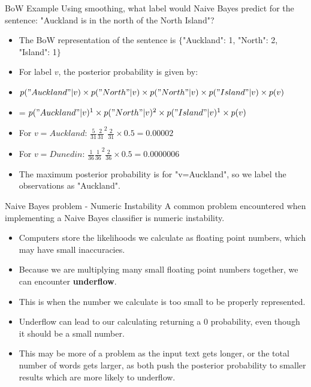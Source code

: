 \documentclass[aspectratio=169, 10pt]{beamer}
\begin{document}
\begin{frame}{BoW Example}
    Using smoothing, what label would Naive Bayes predict for the sentence: "Auckland is in the north of the North Island"?
    \pause
    \begin{itemize}
        \item The BoW representation of the sentence is $\{$"Auckland": 1, "North": 2, "Island": 1$\}$
        \item For label $v$, the posterior probability is given by:
        \item $p("Auckland"|v)\times p("North"|v) \times p("North"|v) \times p("Island"|v) \times p(v)$
        \item = $p("Auckland"|v)^1\times p("North"|v)^2 \times p("Island"|v)^1 \times p(v)$
        \pause
        \item For $v=Auckland$: $\frac{5}{31}\frac{2}{31}^2\frac{2}{31}\times 0.5 = 0.00002$
        \item For $v=Dunedin$: $\frac{1}{36}\frac{1}{36}^2\frac{2}{36}\times 0.5 = 0.0000006$
        \item The maximum posterior probability is for "v=Auckland", so we label the observations as "Auckland".
    \end{itemize}
\end{frame}

\begin{frame}{Naive Bayes problem - Numeric Instability}
    A common problem encountered when implementing a Naive Bayes classifier is numeric instability.
    \begin{itemize}
        \item Computers store the likelihoods we calculate as floating point numbers, which may have small inaccuracies.
        \item Because we are multiplying many small floating point numbers together, we can encounter \textbf{underflow}.
        \item This is when the number we calculate is too small to be properly represented.
        \item Underflow can lead to our calculating returning a 0 probability, even though it should be a small number.
        \item This may be more of a problem as the input text gets longer, or the total number of words gets larger, as both push the posterior probability to smaller results which are more likely to underflow.
    \end{itemize}
\end{frame}
\end{document}
